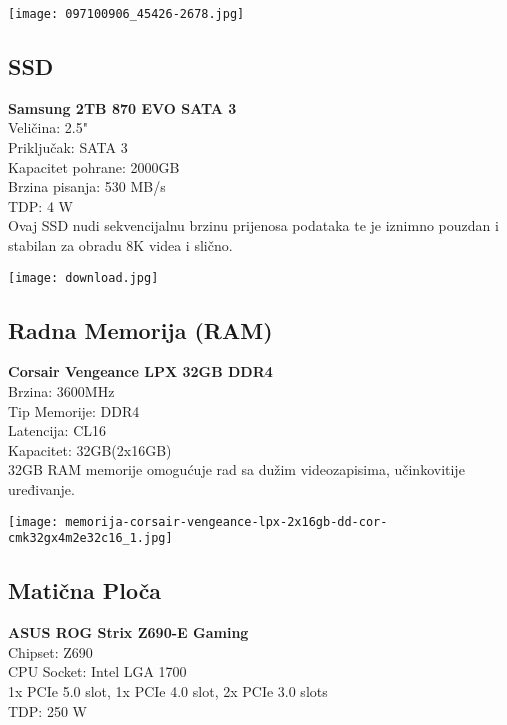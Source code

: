 \documentclass{article}
\begin{document}
\begin{center}
    \texttt{[image: 097100906\_45426-2678.jpg]}
\end{center}



\subsection{SSD}

\textbf{Samsung 2TB 870 EVO SATA 3}\\
Veličina: 2.5"\\
Priključak: SATA 3\\
Kapacitet pohrane: 2000GB\\
Brzina pisanja: 530 MB/s\\
TDP: 4 W\\

Ovaj SSD nudi sekvencijalnu brzinu prijenosa podataka te je iznimno pouzdan i stabilan za obradu 8K videa i slično.

\begin{center}
    \texttt{[image: download.jpg]}
\end{center}


\subsection{Radna Memorija (RAM)}
\textbf{Corsair Vengeance LPX 32GB DDR4}\\
Brzina: 3600MHz\\
Tip Memorije: DDR4\\
Latencija: CL16\\
Kapacitet: 32GB(2x16GB)\\

32GB RAM memorije omogućuje rad sa dužim videozapisima, učinkovitije uređivanje.

\begin{center}
    \texttt{[image: memorija-corsair-vengeance-lpx-2x16gb-dd-cor-cmk32gx4m2e32c16\_1.jpg]}
\end{center}

\subsection{Matična Ploča}
\textbf{ASUS ROG Strix Z690-E Gaming}\\
Chipset: Z690\\
CPU Socket: Intel LGA 1700\\
1x PCIe 5.0 slot, 1x PCIe 4.0 slot, 2x PCIe 3.0 slots\\
TDP: 250 W\\
\end{document}
